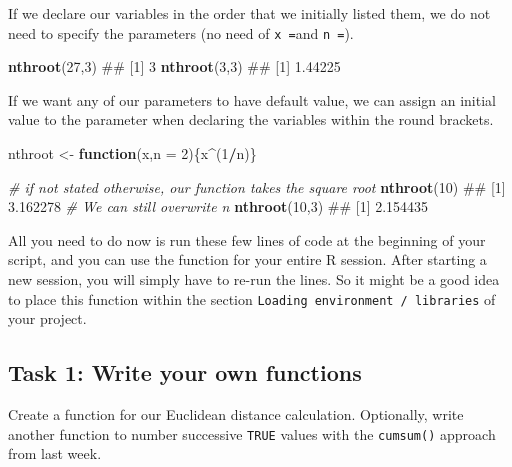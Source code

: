 \documentclass[]{book}
\newenvironment{Shaded}{\begin{snugshade}}{\end{snugshade}}
\newcommand{\KeywordTok}[1]{\textcolor[rgb]{0.13,0.29,0.53}{\textbf{#1}}}
\newcommand{\DataTypeTok}[1]{\textcolor[rgb]{0.13,0.29,0.53}{#1}}
\newcommand{\DecValTok}[1]{\textcolor[rgb]{0.00,0.00,0.81}{#1}}
\newcommand{\StringTok}[1]{\textcolor[rgb]{0.31,0.60,0.02}{#1}}
\newcommand{\CommentTok}[1]{\textcolor[rgb]{0.56,0.35,0.01}{\textit{#1}}}
\newcommand{\ControlFlowTok}[1]{\textcolor[rgb]{0.13,0.29,0.53}{\textbf{#1}}}
\newcommand{\OperatorTok}[1]{\textcolor[rgb]{0.81,0.36,0.00}{\textbf{#1}}}
\newcommand{\NormalTok}[1]{#1}
\begin{document}
If we declare our variables in the order that we initially listed them,
we do not need to specify the parameters (no need of \texttt{x\ =}and
\texttt{n\ =}).

\begin{Shaded}
\begin{Highlighting}[]
\KeywordTok{nthroot}\NormalTok{(}\DecValTok{27}\NormalTok{,}\DecValTok{3}\NormalTok{)}
\NormalTok{## [1] 3}
\KeywordTok{nthroot}\NormalTok{(}\DecValTok{3}\NormalTok{,}\DecValTok{3}\NormalTok{)}
\NormalTok{## [1] 1.44225}
\end{Highlighting}
\end{Shaded}

If we want any of our parameters to have default value, we can assign an
initial value to the parameter when declaring the variables within the
round brackets.

\begin{Shaded}
\begin{Highlighting}[]
\NormalTok{nthroot <-}\StringTok{ }\ControlFlowTok{function}\NormalTok{(x,}\DataTypeTok{n =} \DecValTok{2}\NormalTok{)\{x}\OperatorTok{^}\NormalTok{(}\DecValTok{1}\OperatorTok{/}\NormalTok{n)\}}

\CommentTok{# if not stated otherwise, our function takes the square root}
\KeywordTok{nthroot}\NormalTok{(}\DecValTok{10}\NormalTok{)}
\NormalTok{## [1] 3.162278}
\CommentTok{# We can still overwrite n}
\KeywordTok{nthroot}\NormalTok{(}\DecValTok{10}\NormalTok{,}\DecValTok{3}\NormalTok{)}
\NormalTok{## [1] 2.154435}
\end{Highlighting}
\end{Shaded}

All you need to do now is run these few lines of code at the beginning
of your script, and you can use the function for your entire R session.
After starting a new session, you will simply have to re-run the lines.
So it might be a good idea to place this function within the section
\texttt{Loading\ environment\ /\ libraries} of your project.

\subsection{Task 1: Write your own
functions}\label{task-1-write-your-own-functions}

Create a function for our Euclidean distance calculation. Optionally,
write another function to number successive \texttt{TRUE} values with
the \texttt{cumsum()} approach from last week.
\end{document}
